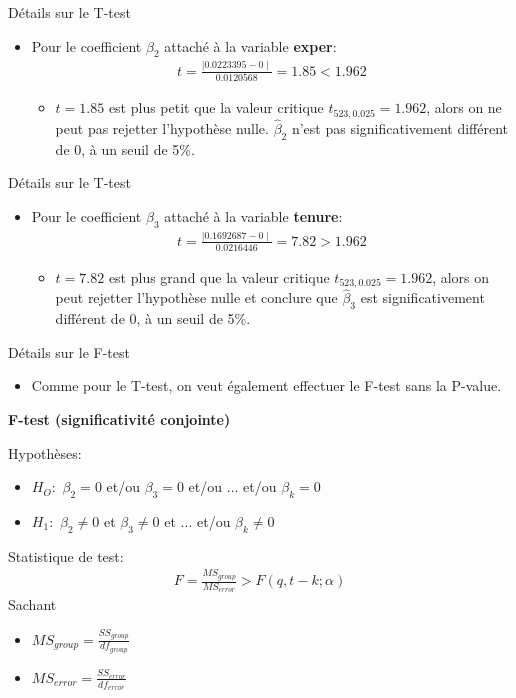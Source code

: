 \documentclass{beamer}
\begin{document}
\begin{frame}{Détails sur le T-test}
\begin{itemize}
\item Pour le coefficient $\beta_2$ attaché à la variable \textbf{exper}:
\begin{align*}
t=\frac{\mid 0.0223395-0 \mid}{0.0120568} = 1.85 < 1.962
\end{align*}
\begin{itemize}
\item $t=1.85$ est plus petit que la valeur critique $t_{523,0.025}=1.962$, alors on ne peut pas rejetter l'hypothèse nulle. $\hat{\beta}_2$ n'est pas significativement différent de 0, à un seuil de 5\%.
\end{itemize}
\end{itemize}
\end{frame}

\begin{frame}{Détails sur le T-test}
\begin{itemize}

\item Pour le coefficient $\beta_3$ attaché à la variable \textbf{tenure}:
\begin{align*}
t=\frac{\mid 0.1692687-0 \mid}{0.0216446} = 7.82 > 1.962
\end{align*}
\begin{itemize}
\item $t=7.82$ est plus grand que la valeur critique $t_{523,0.025}=1.962$, alors on peut rejetter l'hypothèse nulle et conclure que $\hat{\beta}_3$ est significativement différent de 0, à un seuil de 5\%.
\end{itemize}
\end{itemize}
\end{frame}


\begin{frame}{Détails sur le F-test}
\begin{itemize}
\item Comme pour le T-test, on veut également effectuer le F-test sans la P-value.
\end{itemize}
\textbf{F-test (significativité conjointe)}
\begin{block}{Hypothèses:}
\begin{itemize}
\item $H_O:$ $\beta_2 =0$ et/ou $\beta_3 = 0$ et/ou $...$ et/ou $\beta_k=0$
\item $H_1:$ $\beta_2 \neq 0$ et $\beta_3 \neq 0$ et $...$ et/ou $\beta_k \neq 0$
\end{itemize}
\end{block}
\begin{block}{Statistique de test:}
\begin{align*}
F=\frac{MS_{group}}{MS_{error}}>F(q,t-k;\alpha)
\end{align*}
Sachant
\begin{itemize}
\item $MS_{group}=\frac{SS_{group}}{df_{group}}$
\item $MS_{error}=\frac{SS_{error}}{df_{error}}$
\end{itemize}
\end{block}
\end{frame}
\end{document}
